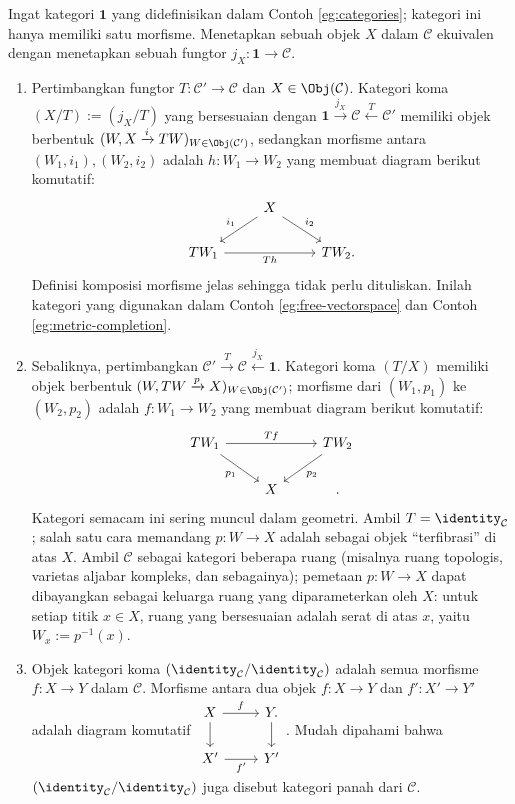 Ingat kategori $\mathbf{1}$ yang didefinisikan dalam Contoh \ref{eg:categories}; kategori ini hanya memiliki satu morfisme. Menetapkan sebuah objek $X$ dalam $\mathcal{C}$ ekuivalen dengan menetapkan sebuah fungtor $j_X: \mathbf{1} \to \mathcal{C}$. 
\begin{enumerate}
	\item Pertimbangkan fungtor $T: \mathcal{C}' \to \mathcal{C}$ dan $X \in \Obj(\mathcal{C})$. Kategori koma $(X / T) := (j_X / T)$ yang bersesuaian dengan $\mathbf{1} \xrightarrow{j_X} \mathcal{C} \xleftarrow{T} \mathcal{C}'$ memiliki objek berbentuk $(W, X \xrightarrow{i} TW)_{W \in \Obj(\mathcal{C}')}$, sedangkan morfisme antara $(W_1, i_1), (W_2, i_2)$ adalah $h: W_1 \to W_2$ yang membuat diagram berikut komutatif:
		\[ \begin{tikzcd}
			{} & X \arrow[ld, "i_1"'] \arrow[rd, "i_2"] & \\
			TW_1 \arrow[rr, "Th"'] & & TW_2 .
		\end{tikzcd} \]
		Definisi komposisi morfisme jelas sehingga tidak perlu dituliskan. Inilah kategori yang digunakan dalam Contoh \ref{eg:free-vectorspace} dan Contoh \ref{eg:metric-completion}.
  \item Sebaliknya, pertimbangkan $\mathcal{C}' \xrightarrow{T} \mathcal{C} \xleftarrow{j_X} \mathbf{1}$. Kategori koma $(T / X)$ memiliki objek berbentuk $(W, TW \xrightarrow{p} X)_{W \in \Obj(\mathcal{C}')}$; morfisme dari $(W_1, p_1)$ ke $(W_2, p_2)$ adalah $f: W_1 \to W_2$ yang membuat diagram berikut komutatif:
		\[ \begin{tikzcd}
			TW_1 \arrow[rd, "p_1"'] \arrow[rr, "Tf"] & & TW_2 \arrow[ld, "p_2"] \\
			& X & .
		\end{tikzcd} \]
		Kategori semacam ini sering muncul dalam geometri. Ambil $T = \identity_{\mathcal{C}}$; salah satu cara memandang $p: W \to X$ adalah sebagai objek ``terfibrasi'' di atas $X$. Ambil $\mathcal{C}$ sebagai kategori beberapa ruang (misalnya ruang topologis, varietas aljabar kompleks, dan sebagainya); pemetaan $p: W \to X$ dapat dibayangkan sebagai keluarga ruang yang diparameterkan oleh $X$: untuk setiap titik $x \in X$, ruang yang bersesuaian adalah serat di atas $x$, yaitu $W_x := p^{-1}(x)$.

	\item Objek kategori koma $(\identity_{\mathcal{C}} / \identity_{\mathcal{C}})$ adalah semua morfisme $f: X \to Y$ dalam $\mathcal{C}$. Morfisme antara dua objek $f: X \to Y$ dan $f': X' \to Y'$ adalah diagram komutatif
	$\begin{tikzcd}
		X \arrow[r, "f"] \arrow[d] & Y \arrow[d] . \\
		X' \arrow[r, "f'"'] & Y'
	\end{tikzcd}$.
	Mudah dipahami bahwa $(\identity_{\mathcal{C}} / \identity_{\mathcal{C}})$ juga disebut kategori panah dari $\mathcal{C}$.
\end{enumerate}

